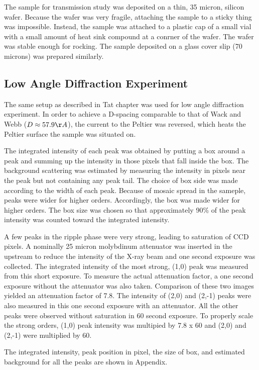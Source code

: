 The sample for transmission study was deposited on a thin, 35 micron, silicon
wafer. Because the wafer was very fragile, attaching the sample to a sticky 
thing was impossible. Instead, the sample was attached to a plastic cap of 
a small vial with a small amount of heat sink compound at a conrner of the 
wafer. The wafer was stable enough for rocking. The sample deposited on a 
glass cover slip (70 microns) was prepared similarly.  

\subsection{Low Angle Diffraction Experiment}
The same setup as described in Tat chapter was used for low angle diffraction
experiment. In order to achieve a D-spacing comparable to that of Wack and Webb
($D \approx 57.9 \AA$), the current to the Peltier was reversed, which heats the 
Peltier surface the sample was situated on. 

The integrated intensity of each peak was obtained by putting a box around a
peak and summing up the intensity in those pixels that fall inside the box.
The background scattering was estimated by measuring the intensity in pixels
near the peak but not containing any peak tail. The choice of box side was 
made according to the width of each peak. Because of mosaic spread in the sameple,
peaks were wider for higher orders. Accordingly, the box was made wider for higher
orders. The box size was chosen so that approximately 90\% of the peak intensity
was counted toward the integrated intensity.

A few peaks in the ripple phase
were very strong, leading to saturation of CCD pixels. A nominally 25 micron 
molybdinum attenuator was inserted in the upstream to reduce the intensity
of the X-ray beam and one second exposure was collected. The integrated intensity 
of the most strong, (1,0) peak was measured from this short exposure. To
measure the actual attenuation factor, a one second exposure without the 
attenuator was also taken. Comparison of these two images yielded an 
attenuation factor of 7.8. The intensity of (2,0) and (2,-1) peaks were also
measured in this one second exposure with an attenuator. All the other peaks
were observed without saturation in 60 second exposure. To properly scale the 
strong orders, (1,0) peak intensity was multipied by 7.8 x 60 and (2,0) and
(2,-1) were multiplied by 60. 

The integrated intensity, peak position in pixel, the size of box, and estimated
background for all the peaks are shown in Appendix.

